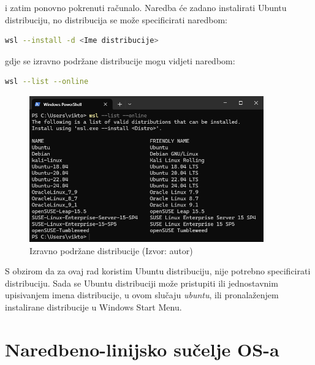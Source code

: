 \documentclass{foi}
\begin{document}
\begin{flushleft}i zatim ponovno pokrenuti računalo. Naredba će zadano instalirati Ubuntu distribuciju, no distribucija se može specificirati naredbom:\end{flushleft}

\begin{lstlisting}[language=bash]
wsl --install -d <Ime distribucije>
\end{lstlisting}

\begin{flushleft}gdje se izravno podržane distribucije mogu vidjeti naredbom:\end{flushleft}

\begin{lstlisting}[language=bash]
wsl --list --online
\end{lstlisting}

\begin{figure}[H]
    \centering
    \includegraphics[width=0.9\textwidth]{slike/lista_distribucija.png}
    \caption{Izravno podržane distribucije (Izvor: autor)}
    \label{fig:distribucije}
\end{figure}

\begin{flushleft}S obzirom da za ovaj rad koristim Ubuntu distribuciju, nije potrebno specificirati distribuciju. Sada se Ubuntu distribuciji može pristupiti ili jednostavnim upisivanjem imena distribucije, u ovom slučaju \textit{ubuntu}, ili pronalaženjem instalirane distribucije u Windows Start Menu.\end{flushleft}


\chapter{Naredbeno-linijsko sučelje OS-a}
\end{document}

